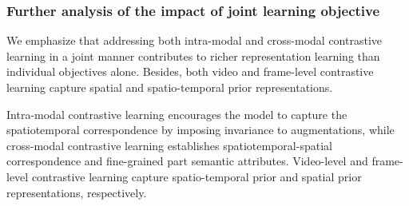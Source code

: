 \begin{table}[h!]
\centering
\scriptsize
{}
\caption{Impact of varying decoder depth on action classification accuracy.}
\label{tab:decoder}
\end{table}






\subsubsection{Further analysis of the impact of joint learning objective} We emphasize that addressing both intra-modal and cross-modal contrastive learning in a joint manner contributes to richer representation learning than individual objectives alone. Besides, both video and frame-level contrastive learning capture spatial and spatio-temporal prior representations. 

Intra-modal contrastive learning encourages the model to capture the spatiotemporal correspondence by imposing invariance to augmentations, while cross-modal contrastive learning establishes spatiotemporal-spatial correspondence and fine-grained part semantic attributes. Video-level and frame-level contrastive learning capture spatio-temporal prior and spatial prior representations, respectively. 


\begin{table}[h!]
\centering
{}

\caption{Effect of the joint learning objective on intra-modal, cross-modal, frame-level, and video-level tasks. Action recognition performance of pre-trained embeddings evaluated on the SSv2 dataset under the default configuration.}
\label{tab:table8}

\end{table}

